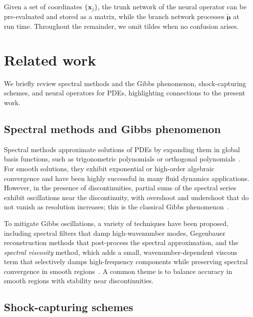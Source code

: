 \documentclass[a4paper,fleqn]{cas-dc}
\begin{document}
Given a set of coordinates $\{\mathbf{x}_j\}$, the trunk network of the neural operator can be pre-evaluated and stored as a matrix, while the branch network processes $\tilde{\boldsymbol{\mu}}$ at run time.
Throughout the remainder, we omit tildes when no confusion arises.

\section{Related work}
\label{sec:related}

We briefly review spectral methods and the Gibbs phenomenon, shock-capturing schemes, and neural operators for PDEs, highlighting connections to the present work.

\subsection{Spectral methods and Gibbs phenomenon}

Spectral methods approximate solutions of PDEs by expanding them in global basis functions, such as trigonometric polynomials or orthogonal polynomials~\citep{Gottlieb1977SpectralBook,Canuto1988Spectral}.
For smooth solutions, they exhibit exponential or high-order algebraic convergence and have been highly successful in many fluid dynamics applications.
However, in the presence of discontinuities, partial sums of the spectral series exhibit oscillations near the discontinuity, with overshoot and undershoot that do not vanish as resolution increases; this is the classical Gibbs phenomenon~\citep{Gottlieb2011GibbsReview}.

To mitigate Gibbs oscillations, a variety of techniques have been proposed, including spectral filters that damp high-wavenumber modes, Gegenbauer reconstruction methods that post-process the spectral approximation, and the \emph{spectral viscosity} method, which adds a small, wavenumber-dependent viscous term that selectively damps high-frequency components while preserving spectral convergence in smooth regions~\citep{Tadmor1989SpectralViscosity,Gottlieb2011GibbsReview}.
A common theme is to balance accuracy in smooth regions with stability near discontinuities.

\subsection{Shock-capturing schemes}
\end{document}

